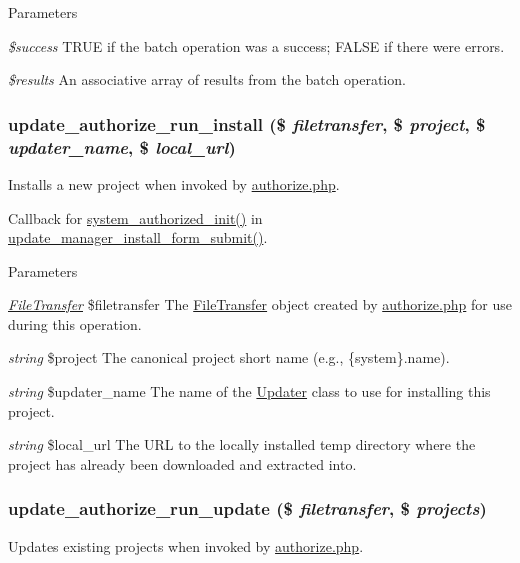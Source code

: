 \begin{DoxyParams}{Parameters}
\item[{\em \$success}]TRUE if the batch operation was a success; FALSE if there were errors. \item[{\em \$results}]An associative array of results from the batch operation. \end{DoxyParams}
\hypertarget{update_8authorize_8inc_a284ce6e21de87c3f0e39bbde1a1b6556}{
\subsubsection[{update\_\-authorize\_\-run\_\-install}]{\setlength{\rightskip}{0pt plus 5cm}update\_\-authorize\_\-run\_\-install (\$ {\em filetransfer}, \/  \$ {\em project}, \/  \$ {\em updater\_\-name}, \/  \$ {\em local\_\-url})}}
\label{update_8authorize_8inc_a284ce6e21de87c3f0e39bbde1a1b6556}
Installs a new project when invoked by \hyperlink{authorize_8php}{authorize.php}.

Callback for \hyperlink{group__authorize_ga17756b29805705dbea25798d6004d5dd}{system\_\-authorized\_\-init()} in \hyperlink{group__update__manager__install_ga52e9f2cddddddccf921284b01f9505b0}{update\_\-manager\_\-install\_\-form\_\-submit()}.


\begin{DoxyParams}{Parameters}
\item[{\em \hyperlink{classFileTransfer}{FileTransfer}}]\$filetransfer The \hyperlink{classFileTransfer}{FileTransfer} object created by \hyperlink{authorize_8php}{authorize.php} for use during this operation. \item[{\em string}]\$project The canonical project short name (e.g., \{system\}.name). \item[{\em string}]\$updater\_\-name The name of the \hyperlink{classUpdater}{Updater} class to use for installing this project. \item[{\em string}]\$local\_\-url The URL to the locally installed temp directory where the project has already been downloaded and extracted into. \end{DoxyParams}
\hypertarget{update_8authorize_8inc_a640c629480dadbca39814ac8be63e21b}{
\subsubsection[{update\_\-authorize\_\-run\_\-update}]{\setlength{\rightskip}{0pt plus 5cm}update\_\-authorize\_\-run\_\-update (\$ {\em filetransfer}, \/  \$ {\em projects})}}
\label{update_8authorize_8inc_a640c629480dadbca39814ac8be63e21b}
Updates existing projects when invoked by \hyperlink{authorize_8php}{authorize.php}.

